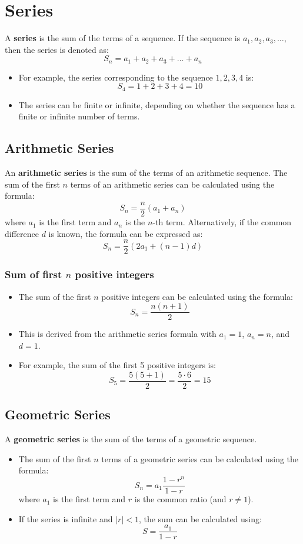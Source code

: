 \section{Series}
A \textbf{series} is the sum of the terms of a sequence. If the sequence is \(a_1, a_2, a_3, \ldots\), then the series is denoted as:
\[ S_n = a_1 + a_2 + a_3 + \ldots + a_n \]
\begin{itemize}
    \item For example, the series corresponding to the sequence \(1, 2, 3, 4\) is:
    \[ S_4 = 1 + 2 + 3 + 4 = 10 \]
    \item The series can be finite or infinite, depending on whether the sequence has a finite or infinite number of terms.
\end{itemize}

\subsection{Arithmetic Series}
An \textbf{arithmetic series} is the sum of the terms of an arithmetic sequence.
The sum of the first \(n\) terms of an arithmetic series can be calculated using the formula:
\[ S_n = \frac{n}{2} (a_1 + a_n) \]
where \(a_1\) is the first term and \(a_n\) is the \(n\)-th term.
Alternatively, if the common difference \(d\) is known, the formula can be expressed as:
\[ S_n = \frac{n}{2} (2a_1 + (n-1)d) \]

\subsubsection{Sum of first \(n\) positive integers}
\begin{itemize}
    \item The sum of the first \(n\) positive integers can be calculated using the formula:
    \[ S_n = \frac{n(n+1)}{2} \]
    \item This is derived from the arithmetic series formula with \(a_1 = 1\), \(a_n = n\), and \(d = 1\).
    \item For example, the sum of the first 5 positive integers is:
    \[ S_5 = \frac{5(5+1)}{2} = \frac{5 \cdot 6}{2} = 15 \]
\end{itemize}

\subsection{Geometric Series}
A \textbf{geometric series} is the sum of the terms of a geometric sequence.
\begin{itemize}
    \item The sum of the first \(n\) terms of a geometric series can be calculated using the formula:
    \[ S_n = a_1 \frac{1 - r^n}{1 - r} \]
    where \(a_1\) is the first term and \(r\) is the common ratio (and \(r \neq 1\)).
    \item If the series is infinite and \(|r| < 1\), the sum can be calculated using:
    \[ S = \frac{a_1}{1 - r} \]
\end{itemize}


